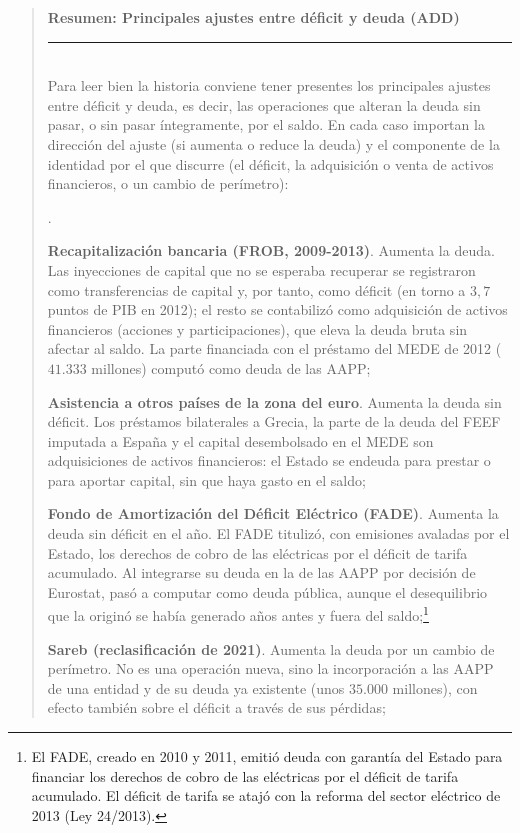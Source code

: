 \documentclass[10pt,a4paper]{article}
\newcounter{numitem}
\newenvironment{lnum}
      {\begin{list}{\arabic{numitem}.}{%
          \usecounter{numitem}%
          \setlength{\leftmargin}{1cm}%
          \setlength{\parskip}{3pt}%
          \setlength{\itemsep}{0pt}%
          \setlength{\parsep}{0pt}%
      }}
      {\end{list}}
\newenvironment{specialblock}[1]{%
      \begin{quote} %
      \small %
      \noindent\textbf{#1}\\[-0.3em] %
      \rule{\linewidth}{0.4pt}\\[0.6em]}{
      \end{quote}}
\begin{document}
\begin{specialblock}{\textbf{Resumen}: Principales ajustes entre déficit y deuda (ADD)}
    Para leer bien la historia conviene tener presentes los principales ajustes entre déficit y deuda, es decir, las operaciones que alteran la deuda sin pasar, o sin pasar íntegramente, por el saldo. En cada caso importan la dirección del ajuste (si aumenta o reduce la deuda) y el componente de la identidad por el que discurre (el déficit, la adquisición o venta de activos financieros, o un cambio de perímetro):
    \begin{lnum}
        \item \textbf{Recapitalización bancaria (FROB, 2009-2013)}. Aumenta la deuda. Las inyecciones de capital que no se esperaba recuperar se registraron como transferencias de capital y, por tanto, como déficit (en torno a $3,7$ puntos de PIB en 2012); el resto se contabilizó como adquisición de activos financieros (acciones y participaciones), que eleva la deuda bruta sin afectar al saldo. La parte financiada con el préstamo del MEDE de 2012 ($41.333$ millones) computó como deuda de las AAPP;
        \item \textbf{Asistencia a otros países de la zona del euro}. Aumenta la deuda sin déficit. Los préstamos bilaterales a Grecia, la parte de la deuda del FEEF imputada a España y el capital desembolsado en el MEDE son adquisiciones de activos financieros: el Estado se endeuda para prestar o para aportar capital, sin que haya gasto en el saldo;
        \item \textbf{Fondo de Amortización del Déficit Eléctrico (FADE)}. Aumenta la deuda sin déficit en el año. El FADE titulizó, con emisiones avaladas por el Estado, los derechos de cobro de las eléctricas por el déficit de tarifa acumulado. Al integrarse su deuda en la de las AAPP por decisión de Eurostat, pasó a computar como deuda pública, aunque el desequilibrio que la originó se había generado años antes y fuera del saldo;\footnote{El FADE, creado en 2010 y 2011, emitió deuda con garantía del Estado para financiar los derechos de cobro de las eléctricas por el déficit de tarifa acumulado. El déficit de tarifa se atajó con la reforma del sector eléctrico de 2013 (Ley 24/2013).
        }
        \item \textbf{Sareb (reclasificación de 2021)}. Aumenta la deuda por un cambio de perímetro. No es una operación nueva, sino la incorporación a las AAPP de una entidad y de su deuda ya existente (unos $35.000$ millones), con efecto también sobre el déficit a través de sus pérdidas;

\end{lnum}
\end{specialblock}
\end{document}
